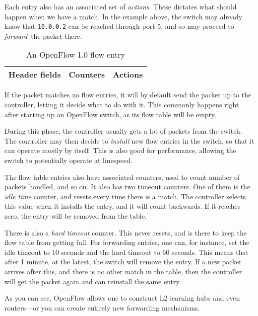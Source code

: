 Each entry also has an associated set of \textit{actions}.  These dictates
what should happen when we have a match.  In the example above, the switch
may already know that \texttt{10.0.0.2} can be reached through port 5, and
so may proceed to \textit{forward} the packet there.

\begin{table}[H]
  \centering
  \begin{tabular}{|l|l|l|}
    \hline \textbf{Header fields} &
           \textbf{Counters} &
           \textbf{Actions} \\
    \hline
  \end{tabular}

  \caption{An OpenFlow 1.0 \cite{openflow-1.0} flow entry}
  \label{openflow.flow.entry.spec}
\end{table}

If the packet matches no flow entries, it will by default send the packet up
to the controller, letting it decide what to do with it.  This commonly
happens right after starting up an OpenFlow switch, as its flow table will
be empty.

During this phase, the controller usually gets a lot of packets from the
switch.  The controller may then decide to \textit{install} new flow entries
in the switch, so that it can operate mostly by itself.  This is also good
for performance, allowing the switch to potentially operate at linespeed.

The flow table entries also have associated counters, used to count number
of packets handled, and so on.  It also has two timeout counters.  One of
them is the \textit{idle time} counter, and resets every time there is a
match.  The controller
selects this value when it installs the entry, and it will count backwards.
If it reaches zero, the entry will be removed from the table.

There is also a \textit{hard timeout} counter.  This never resets, and is
there to keep the flow table from getting full.  For forwarding entries, one
can, for instance, set the idle timeout to 10 seconds and the hard timeout
to 60 seconds.  This means that after 1 minute, at the latest, the switch
will remove the entry.  If a new packet arrives after this, and there is no
other match in the table, then the controller will get the packet again and
can reinstall the same entry.

As you can see, OpenFlow allows one to construct L2 learning hubs and even
routers---or you can create entirely new forwarding mechanisms.

